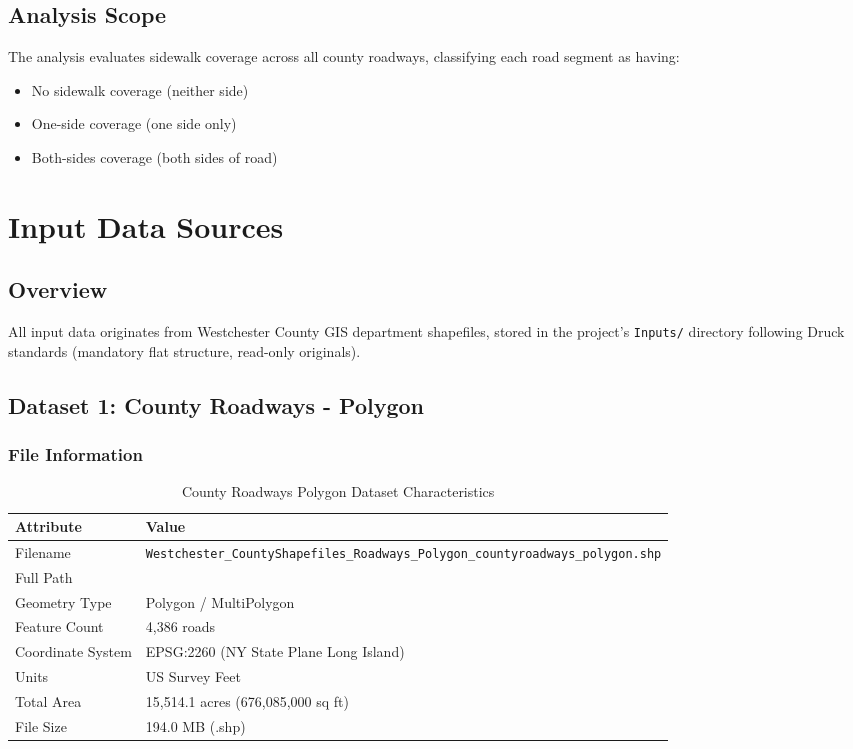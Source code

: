 \documentclass[11pt,letterpaper]{article}
\begin{document}
\subsection{Analysis Scope}

The analysis evaluates sidewalk coverage across all county roadways, classifying each road segment as having:
\begin{itemize}
    \item No sidewalk coverage (neither side)
    \item One-side coverage (one side only)
    \item Both-sides coverage (both sides of road)
\end{itemize}

\section{Input Data Sources}

\subsection{Overview}

All input data originates from Westchester County GIS department shapefiles, stored in the project's \texttt{Inputs/} directory following Druck standards (mandatory flat structure, read-only originals).

\subsection{Dataset 1: County Roadways - Polygon}

\subsubsection{File Information}
\begin{table}[H]
\centering
\begin{tabular}{ll}
\toprule
\textbf{Attribute} & \textbf{Value} \\
\midrule
Filename & \texttt{Westchester\_CountyShapefiles\_Roadways\_Polygon\_countyroadways\_polygon.shp} \\
Full Path & \texttt{} \\
Geometry Type & Polygon / MultiPolygon \\
Feature Count & 4,386 roads \\
Coordinate System & EPSG:2260 (NY State Plane Long Island) \\
Units & US Survey Feet \\
Total Area & 15,514.1 acres (676,085,000 sq ft) \\
File Size & 194.0 MB (.shp) \\
\bottomrule
\end{tabular}
\caption{County Roadways Polygon Dataset Characteristics}
\label{tab:roads_poly}
\end{table}
\end{document}
